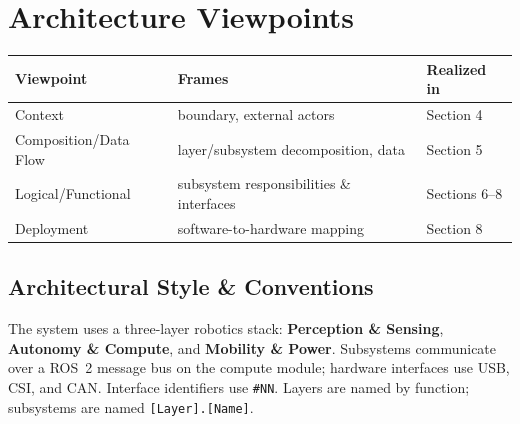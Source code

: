 \documentclass[11pt,letterpaper]{article}
\begin{document}
\section{Architecture Viewpoints}
\begin{table}[H]\begin{center}
\begin{tabular}{ | p{3cm} | p{6.5cm} | p{3cm} |}\hline
\textbf{Viewpoint} & \textbf{Frames} & \textbf{Realized in} \\ \hline
Context & boundary, external actors & Section 4 \\ \hline
Composition/Data Flow & layer/subsystem decomposition, data & Section 5 \\ \hline
Logical/Functional & subsystem responsibilities \& interfaces & Sections 6--8 \\ \hline
Deployment & software-to-hardware mapping & Section 8 \\ \hline
\end{tabular}\end{center}\end{table}
\subsection{Architectural Style \& Conventions}
The system uses a three-layer robotics stack: \textbf{Perception \& Sensing},
\textbf{Autonomy \& Compute}, and \textbf{Mobility \& Power}. Subsystems
communicate over a ROS~2 message bus on the compute module; hardware interfaces use
USB, CSI, and CAN. Interface identifiers use \texttt{\#NN}. Layers are named by
function; subsystems are named \texttt{[Layer].[Name]}.
\end{document}
